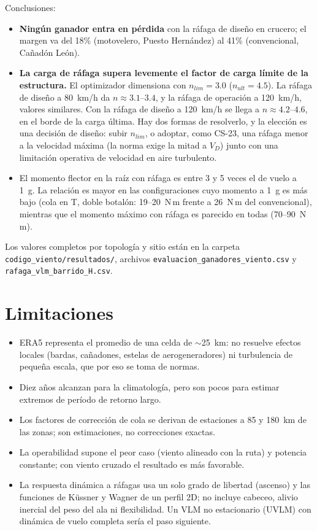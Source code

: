 \documentclass[11pt]{article}
\begin{document}
Conclusiones:
\begin{itemize}
  \item \textbf{Ningún ganador entra en pérdida} con la ráfaga de diseño en
  crucero; el margen va del 18\% (motovelero, Puesto Hernández) al 41\%
  (convencional, Cañadón León).
  \item \textbf{La carga de ráfaga supera levemente el factor de carga límite
  de la estructura.} El optimizador dimensiona con $n_{lim}=3.0$
  ($n_{ult}=4.5$). La ráfaga de diseño a 80~km/h da $n\approx3.1$--$3.4$, y la
  ráfaga de operación a 120~km/h, valores similares. Con la ráfaga de diseño
  a 120~km/h se llega a $n\approx4.2$--$4.6$, en el borde de la carga última.
  Hay dos formas de resolverlo, y la elección es una decisión de diseño:
  subir $n_{lim}$, o adoptar, como CS-23, una ráfaga menor a la velocidad
  máxima (la norma exige la mitad a $V_D$) junto con una limitación operativa
  de velocidad en aire turbulento.
  \item El momento flector en la raíz con ráfaga es entre 3 y 5 veces el de
  vuelo a 1~g. La relación es mayor en las configuraciones cuyo momento a
  1~g es más bajo (cola en T, doble botalón: 19--20~N\,m frente a 26~N\,m
  del convencional), mientras que el momento máximo con ráfaga es parecido en
  todas (70--90~N\,m).
\end{itemize}

Los valores completos por topología y sitio están en la carpeta
\texttt{codigo\_viento/resultados/}, archivos
\texttt{evaluacion\_ganadores\_viento.csv} y
\texttt{rafaga\_vlm\_barrido\_H.csv}.

\section{Limitaciones}
\label{sec:limitaciones}

\begin{itemize}
  \item ERA5 representa el promedio de una celda de $\sim$25~km: no
  resuelve efectos locales (bardas, cañadones, estelas de aerogeneradores) ni
  turbulencia de pequeña escala, que por eso se toma de normas.
  \item Diez años alcanzan para la climatología, pero son pocos para
  estimar extremos de período de retorno largo.
  \item Los factores de corrección de cola se derivan de estaciones a 85 y
  180~km de las zonas; son estimaciones, no correcciones exactas.
  \item La operabilidad supone el peor caso (viento alineado con la ruta) y
  potencia constante; con viento cruzado el resultado es más favorable.
  \item La respuesta dinámica a ráfagas usa un solo grado de libertad
  (ascenso) y las funciones de Küssner y Wagner de un perfil 2D; no incluye
  cabeceo, alivio inercial del peso del ala ni flexibilidad. Un VLM no
  estacionario (UVLM) con dinámica de vuelo completa sería el paso siguiente.
\end{itemize}
\end{document}
